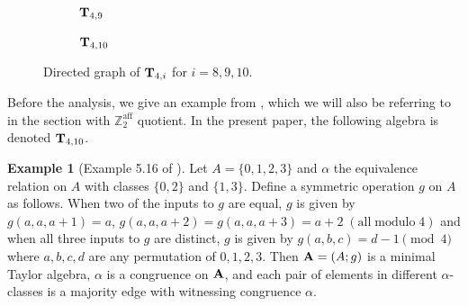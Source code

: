 \documentclass[11pt]{amsart}
\newcommand{\m}[1]{\mathbf{\uppercase{#1}}}
\theoremstyle{definition}
\newtheorem{exmp}{Example}[section]
\theoremstyle{remark}
\theoremstyle{plain}
\begin{document}
\begin{figure}[ht]
\begin{subfigure}{0.33\textwidth}
\begin{tikzpicture}
		\end{tikzpicture}
		\caption{$\m t_{4,9}$}
	\end{subfigure}
	\hfill
	\begin{subfigure}{0.33\textwidth}
		\centering
		\caption{$\m t_{4,10}$}
	\end{subfigure}
	
	\caption{Directed graph of $\m t_{4,i}$ for $i=8,9,10$.}
\end{figure}

Before the analysis, we give an example from \cite{dreamteam}, which we will also be referring to in the section with $\mathbb{Z}_2^{\mathrm{aff}}$ quotient. In the present paper, the following algebra is denoted $\m t_{4,10}$.
\begin{exmp}[Example 5.16 of \cite{dreamteam}]\label{example5.16}
Let $A=\{0,1,2,3\}$ and $\alpha$ the equivalence relation on $A$ with classes $\{0,2\}$ and $\{1,3\}$. Define a symmetric operation $g$ on $A$ as follows. When two of the inputs to $g$ are equal, $g$ is given by $g(a,a,a+1)=a$, $g(a,a,a+2)=g(a,a,a+3)=a+2\; (\mathrm{all\; modulo\; 4})$ and when all three inputs to $g$ are distinct, $g$ is given by $g(a,b,c)=d-1\pmod{4}$ where $a,b,c,d$ are any permutation of $0,1,2,3$. Then $\m a=(A;g)$ is a minimal Taylor algebra, $\alpha$ is a congruence on $\m a$, and each pair of elements in different $\alpha$-classes is a majority edge with witnessing congruence $\alpha$.
\end{exmp}
\end{document}
